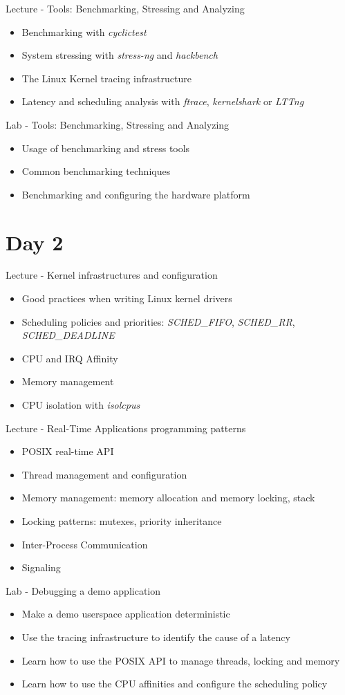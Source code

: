 \documentclass[a4paper,12pt,obeyspaces,spaces,hyphens]{article}
\begin{document}
\feagendatwocolumn
{Lecture - Tools: Benchmarking, Stressing and Analyzing}
{
  \begin{itemize}
  \item Benchmarking with {\em cyclictest}
  \item System stressing with {\em stress-ng} and {\em hackbench}
  \item The Linux Kernel tracing infrastructure
  \item Latency and scheduling analysis with {\em ftrace}, {\em
      kernelshark} or {\em LTTng}
  \end{itemize}
}
{Lab - Tools: Benchmarking, Stressing and Analyzing}
{
  \begin{itemize}
  \item Usage of benchmarking and stress tools
  \item Common benchmarking techniques
  \item Benchmarking and configuring the hardware platform
  \end{itemize}
}

\section{Day 2}

\feagendaonecolumn
{Lecture - Kernel infrastructures and configuration}
{
  \begin{itemize}
  \item Good practices when writing Linux kernel drivers
  \item Scheduling policies and priorities: {\em SCHED\_FIFO}, {\em
      SCHED\_RR}, {\em SCHED\_DEADLINE}
  \item CPU and IRQ Affinity
  \item Memory management
  \item CPU isolation with {\em isolcpus}
  \end{itemize}
}

\feagendatwocolumn
{Lecture - Real-Time Applications programming patterns}
{
  \begin{itemize}
  \item POSIX real-time API
  \item Thread management and configuration
  \item Memory management: memory allocation and memory locking, stack
  \item Locking patterns: mutexes, priority inheritance
  \item Inter-Process Communication
  \item Signaling
  \end{itemize}
}
{Lab - Debugging a demo application}
{
  \begin{itemize}
  \item Make a demo userspace application deterministic
  \item Use the tracing infrastructure to identify the cause of a latency
  \item Learn how to use the POSIX API to manage threads, locking and memory
  \item Learn how to use the CPU affinities and configure the scheduling policy
  \end{itemize}
}
\end{document}
